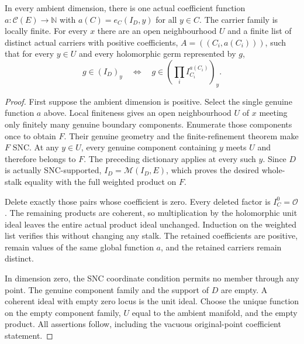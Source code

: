 \begin{theorem}
\label{hir:locally-finite-original-component-product}
\leanok
In every ambient dimension, there is one actual coefficient function
$a:\mathcal C(E)\to\mathbb N$ with
$a(C)=e_C(I_D,y)$ for all $y\in C$.  The carrier family is locally finite.
For every $x$ there are an open neighbourhood $U$ and a finite list of
distinct actual carriers with positive coefficients,
$A=((C_i,a(C_i)))$, such that for every $y\in U$ and every holomorphic
germ represented by $g$,
\[
 g\in(I_D)_y\quad\Longleftrightarrow\quad
 g\in\left(\prod_i I_{C_i}^{a(C_i)}\right)_y.
\]
\end{theorem}
\begin{proof}
First suppose the ambient dimension is positive.  Select the single
genuine function $a$ above.  Local finiteness gives an open neighbourhood
$U$ of $x$ meeting only finitely many genuine boundary components.
Enumerate those components once to obtain $F$.  Their genuine geometry
and the finite-refinement theorem make $F$ SNC.  At any $y\in U$, every
genuine component containing $y$ meets $U$ and therefore belongs to $F$.
The preceding dictionary applies at every such $y$.  Since $D$ is
actually SNC-supported, $I_D=\mathcal M(I_D,E)$, which proves the desired
whole-stalk equality with the full weighted product on $F$.

Delete exactly those pairs whose coefficient is zero.  Every deleted
factor is $I_C^0=\mathcal O$.  The remaining products are coherent, so
multiplication by the holomorphic unit ideal leaves the entire actual
product ideal unchanged.  Induction on the weighted list verifies this
without changing any stalk.  The retained coefficients are positive,
remain values of the same global function $a$, and the retained carriers
remain distinct.

In dimension zero, the SNC coordinate condition permits no member
through any point.  The genuine component family and the support of
$D$ are empty.  A coherent ideal with empty zero locus is the unit ideal.
Choose the unique function on the empty component family, $U$ equal to
the ambient manifold, and the empty product.  All assertions follow,
including the vacuous original-point coefficient statement.
\end{proof}

